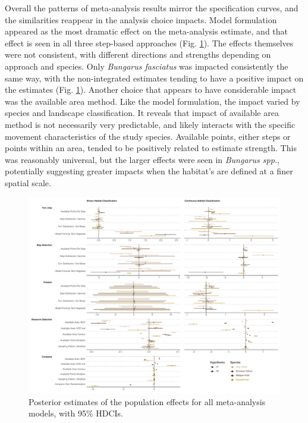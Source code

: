 \documentclass[10pt,a4paper]{article}
\begin{document}
Overall the patterns of meta-analysis results mirror the specification curves, and the similarities reappear in the analysis choice impacts.
Model formulation appeared as the most dramatic effect on the meta-analysis estimate, and that effect is seen in all three step-based approaches (Fig. \ref{fig:metaBetasPlot}).
The effects themselves were not consistent, with different directions and strengths depending on approach and species.
Only \emph{Bungarus fasciatus} was impacted consistently the same way, with the non-integrated estimates tending to have a positive impact on the estimates (Fig. \ref{fig:metaBetasPlot}).
Another choice that appears to have considerable impact was the available area method.
Like the model formulation, the impact varied by species and landscape classification.
It reveals that impact of available area method is not necessarily very predictable, and likely interacts with the specific movement characteristics of the study species.
Available points, either steps or points within an area, tended to be positively related to estimate strength.
This was reasonably universal, but the larger effects were seen in \emph{Bungarus spp.}, potentially suggesting greater impacts when the habitat's are defined at a finer spatial scale.

\begin{figure}
\includegraphics[width=1\linewidth]{../../figures/metaBeta} \caption{Posterior estimates of the population effects for all meta-analysis models, with 95\% HDCIs.}\label{fig:metaBetasPlot}
\end{figure}
\end{document}
